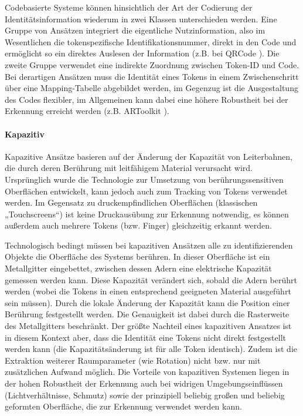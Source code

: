 Codebasierte Systeme können hinsichtlich der Art der Codierung der Identitätsinformation wiederum in zwei Klassen unterschieden werden. Eine Gruppe von Ansätzen integriert die eigentliche Nutzinformation, also im Wesentlichen die tokenspezifische Identifikationsnummer, direkt in den Code und ermöglicht so ein direktes Auslesen der Information (z.B. bei QRCode \citep{QR2008}). Die zweite Gruppe verwendet eine indirekte Zuordnung zwischen Token-ID und Code. Bei derartigen Ansätzen muss die Identität eines Tokens in einem Zwischenschritt über eine Mapping-Tabelle abgebildet werden, im Gegenzug ist die Ausgestaltung des Codes flexibler, im Allgemeinen kann dabei eine höhere Robustheit bei der Erkennung erreicht werden (z.B. ARToolkit \citep{Kato00}).


\paragraph{Kapazitiv} %
\label{par:kapazitiv}

Kapazitive Ansätze basieren auf der Änderung der Kapazität von Leiterbahnen, die durch deren Berührung mit leitfähigem Material verursacht wird. Ursprünglich wurde die Technologie zur Umsetzung von berührungssensitiven Oberflächen entwickelt, kann jedoch auch zum Tracking von Tokens verwendet werden. Im Gegensatz zu druckempfindlichen Oberflächen (klassischen „Touchscreens“) ist keine Druckausübung zur Erkennung notwendig, es können außerdem auch mehrere Tokens (bzw. Finger) gleichzeitig erkannt werden.

Technologisch bedingt müssen bei kapazitiven Ansätzen alle zu identifizierenden Objekte die Oberfläche des Systems berühren. In dieser Oberfläche ist ein Metallgitter eingebettet, zwischen dessen Adern eine elektrische Kapazität gemessen werden kann. Diese Kapazität verändert sich, sobald die Adern berührt werden (wobei die Tokens in einen entsprechend geeigneten Material ausgeführt sein müssen). Durch die lokale Änderung der Kapazität kann die Position einer Berührung festgestellt werden. Die Genauigkeit ist dabei durch die Rasterweite des Metallgitters beschränkt. Der größte Nachteil eines kapazitiven Ansatzes ist in diesem Kontext aber, dass die Identität eine Tokens nicht direkt festgestellt werden kann (die Kapazitätsänderung ist für alle Token identisch). Zudem ist die Extraktion weiterer Raumparameter (wie Rotation) nicht bzw. nur mit zusätzlichen Aufwand möglich. Die Vorteile von kapazitiven Systemen liegen in der hohen Robustheit der Erkennung auch bei widrigen Umgebungseinflüssen (Lichtverhältnisse, Schmutz) sowie der prinzipiell beliebig großen und beliebig geformten Oberfläche, die zur Erkennung verwendet werden kann.

